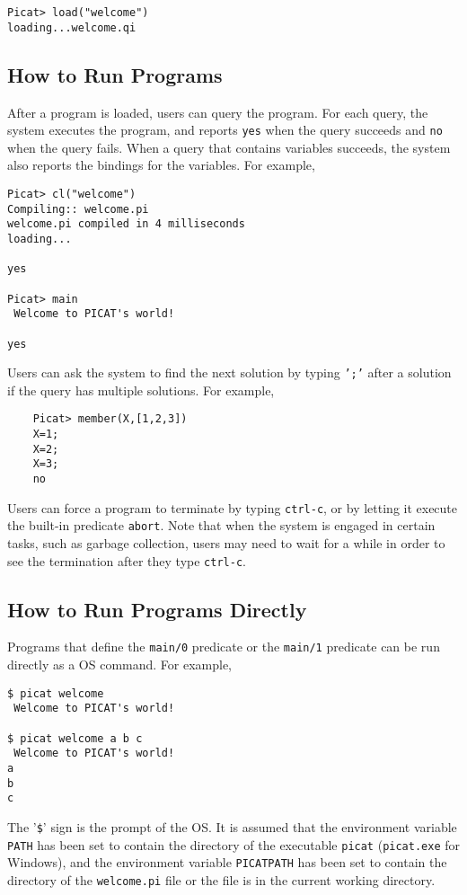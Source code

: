 \begin{itemize}
\begin{verbatim}
Picat> load("welcome")
loading...welcome.qi
\end{verbatim}
\end{itemize}

\subsection{How to Run Programs}
After a program is loaded, users can query the program. For each query, the system executes the program, and reports \texttt{yes} when the query succeeds and \texttt{no} when the query fails. When a query that contains variables succeeds, the system also reports the bindings for the variables. For example,

\begin{verbatim}
Picat> cl("welcome")
Compiling:: welcome.pi
welcome.pi compiled in 4 milliseconds
loading...

yes

Picat> main
 Welcome to PICAT's world! 
 
yes
\end{verbatim}

Users can ask the system to find the next solution by typing \texttt{';'} after a solution if the query has multiple solutions. For example,
\begin{verbatim}
    Picat> member(X,[1,2,3])
    X=1;
    X=2;
    X=3;
    no
\end{verbatim}
Users can force a program to terminate by typing \texttt{ctrl-c}, or by letting it execute the built-in predicate \texttt{abort}. Note that when the system is engaged in certain tasks, such as garbage collection, users may need to wait for a while in order to see the termination after they type \texttt{ctrl-c}.

\subsection{How to Run Programs Directly}
Programs that define the \texttt{main/0} predicate or the \texttt{main/1} predicate can be run directly as a OS command. For example,
\begin{verbatim}
$ picat welcome
 Welcome to PICAT's world!

$ picat welcome a b c
 Welcome to PICAT's world!
a
b
c
\end{verbatim}
The\/ '{\texttt \$}' sign is the prompt of the OS. It is assumed that the environment variable \texttt{PATH} has been set to contain the directory of the executable \texttt{picat} (\texttt{picat.exe} for Windows), and the environment variable \texttt{PICATPATH} has been set to contain the directory of the \texttt{welcome.pi} file or the file is in the current working directory.

